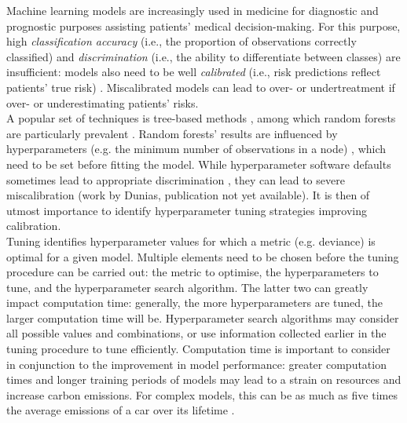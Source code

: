 \documentclass{article}
\begin{document}
Machine learning models are increasingly used in medicine for diagnostic and prognostic purposes \cite{wessler_tufts_2017} assisting patients' medical decision-making. For this purpose, high \textit{classification accuracy} (i.e., the proportion of observations correctly classified) and \textit{discrimination} (i.e., the ability to differentiate between classes) are insufficient: models also need to be well \textit{calibrated} (i.e., risk predictions reflect patients' true risk) \cite{van_calster_calibration_2019}. Miscalibrated models can lead to over- or undertreatment if over- or underestimating patients' risks.\\

A popular set of techniques is tree-based methods \cite{mitchell_machine_1997}, among which random forests are particularly prevalent \cite{uddin_comparing_2019}. Random forests' results are influenced by hyperparameters (e.g. the minimum number of observations in a node) \cite{mantovani_empirical_2019}, which need to be set before fitting the model. While hyperparameter software defaults sometimes lead to appropriate discrimination \cite{bernard_influence_2009}, they can lead to severe miscalibration (work by Dunias, publication not yet available). It is then of utmost importance to identify hyperparameter tuning strategies improving calibration.\\

Tuning identifies hyperparameter values for which a metric (e.g. deviance) is optimal for a given model. Multiple elements need to be chosen before the tuning procedure can be carried out: the metric to optimise, the hyperparameters to tune, and the hyperparameter search algorithm. The latter two can greatly impact computation time: generally, the more hyperparameters are tuned, the larger computation time will be. Hyperparameter search algorithms may consider all possible values and combinations, or use information collected earlier in the tuning procedure to tune efficiently. Computation time is important to consider in conjunction to the improvement in model performance: greater computation times and longer training periods of models may lead to a strain on resources and increase carbon emissions. For complex models, this can be as much as five times the average emissions of a car over its lifetime \cite{strubell_energy_2019}.\\
\end{document}
